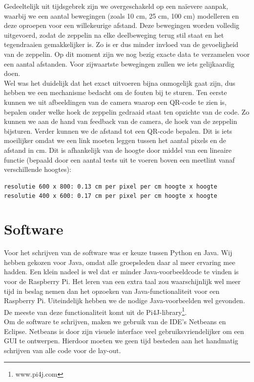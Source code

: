 \documentclass[eind]{penoverslag}
\begin{document}
Gedeeltelijk uit tijdsgebrek zijn we overgeschakeld op een na\"ievere aanpak, waarbij we een aantal bewegingen (zoals 10 cm, 25 cm, 100 cm) modelleren en deze oproepen voor een willekeurige afstand. Deze bewegingen worden volledig uitgevoerd, zodat de zeppelin na elke deelbeweging terug stil staat en het tegendraaien gemakkelijker is. Zo is er dus minder invloed van de gevoeligheid van de zeppelin. Op dit moment zijn we nog bezig exacte data te verzamelen voor een aantal afstanden. Voor zijwaartste bewegingen zullen we iets gelijkaardig doen. \\

Wel was het duidelijk dat het exact uitvoeren bijna onmogelijk gaat zijn, dus hebben we een mechanisme bedacht om de fouten bij te sturen. Ten eerste kunnen we uit afbeeldingen van de camera waarop een QR-code te zien is, bepalen onder welke hoek de zeppelin gedraaid staat ten opzichte van de code. Zo kunnen we aan de hand van feedback van de camera, de hoek van de zeppelin bijsturen. Verder kunnen we de afstand tot een QR-code bepalen. Dit is iets moeilijker omdat we een link moeten leggen tussen het aantal pixels en de afstand in cm. Dit is afhankelijk van de hoogte door middel van een lineaire functie (bepaald door een aantal tests uit te voeren boven een meetlint vanaf verschillende hoogtes):

\begin{center}
\texttt{resolutie 600 x 800: 0.13 cm per pixel per cm hoogte x hoogte}\\
\texttt{resolutie 400 x 600: 0.17 cm per pixel per cm hoogte x hoogte}\\
\end{center}

\section{Software}
Voor het schrijven van de software was er keuze tussen Python en Java. Wij hebben gekozen voor Java, omdat alle groepsleden daar al meer ervaring mee hadden. Een klein nadeel is wel dat er minder Java-voorbeeldcode te vinden is voor de Raspberry Pi. Het leren van een extra taal zou waarschijnlijk wel meer tijd in beslag nemen dan het opzoeken van Java-functionaliteit voor een Raspberry Pi. Uiteindelijk hebben we de nodige Java-voorbeelden wel gevonden. De meeste van deze functionaliteit komt uit de Pi4J-library\footnote{www.pi4j.com}. \\

Om de software te schrijven, maken we gebruik van de IDE's Netbeans en Eclipse. Netbeans is door zijn visuele interface veel gebruiksvriendelijker om een GUI te ontwerpen. Hierdoor moeten we geen tijd besteden aan het handmatig schrijven van alle code voor de lay-out. \\
\end{document}
